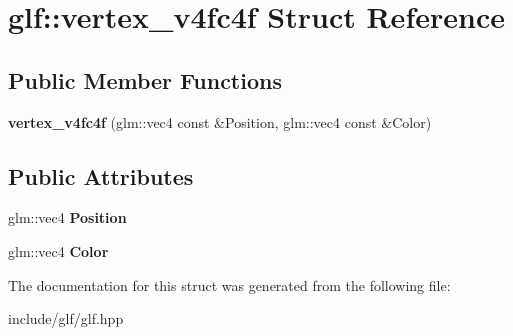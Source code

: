 \hypertarget{structglf_1_1vertex__v4fc4f}{\section{glf\-:\-:vertex\-\_\-v4fc4f Struct Reference}
\label{structglf_1_1vertex__v4fc4f}
}
\subsection*{Public Member Functions}
\begin{DoxyCompactItemize}
\item 
\hypertarget{structglf_1_1vertex__v4fc4f_a8d1aa704f980b20c598dbe0d1f07bcb0}{{\bfseries vertex\-\_\-v4fc4f} (glm\-::vec4 const \&Position, glm\-::vec4 const \&Color)}\label{structglf_1_1vertex__v4fc4f_a8d1aa704f980b20c598dbe0d1f07bcb0}

\end{DoxyCompactItemize}
\subsection*{Public Attributes}
\begin{DoxyCompactItemize}
\item 
\hypertarget{structglf_1_1vertex__v4fc4f_a1d31cdbd360c5a2ddf773dc45b0bdcf1}{glm\-::vec4 {\bfseries Position}}\label{structglf_1_1vertex__v4fc4f_a1d31cdbd360c5a2ddf773dc45b0bdcf1}

\item 
\hypertarget{structglf_1_1vertex__v4fc4f_a632f1c37065f2b6ed09330d1489bb6c7}{glm\-::vec4 {\bfseries Color}}\label{structglf_1_1vertex__v4fc4f_a632f1c37065f2b6ed09330d1489bb6c7}

\end{DoxyCompactItemize}


The documentation for this struct was generated from the following file\-:\begin{DoxyCompactItemize}
\item 
include/glf/glf.\-hpp\end{DoxyCompactItemize}
